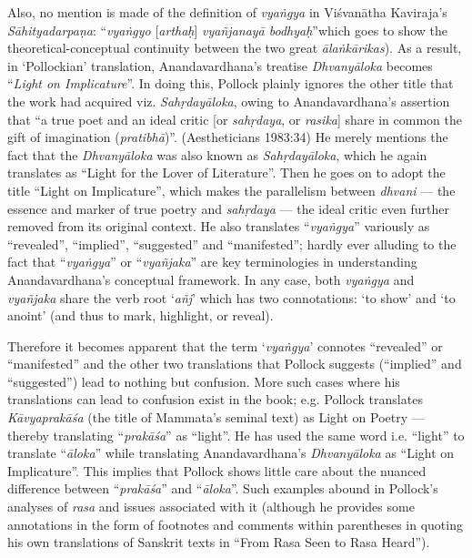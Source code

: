 Also, no mention is made of the definition of \textsl{vyaṅgya} in Viśvanātha Kaviraja’s \textsl{Sāhityadarpaṇa}: “\textsl{vyaṅgyo} [\textsl{arthaḥ}] \textsl{vyañjanayā bodhyaḥ}” which goes to show the theoretical-conceptual continuity between the two great \textsl{ālaṅkārikas}). As a result, in ‘Pollockian’ translation, Anandavardhana’s treatise \textsl{Dhvanyāloka} becomes “\textsl{Light on Implicature}”. In doing this, Pollock plainly ignores the other title that the work had acquired viz. \textsl{Sahṛdayāloka}, owing to Anandavardhana’s assertion that “a true poet and an ideal critic [or \textsl{sahṛdaya}, or \textsl{rasika}] share in common the gift of imagination (\textsl{pratibhā})”. (Aestheticians 1983:34) He merely mentions the fact that the \textsl{Dhvanyāloka} was also known as \textsl{Sahṛdayāloka}, which he again translates as “Light for the Lover of Literature”. Then he goes on to adopt the title “Light on Implicature”, which makes the parallelism between \textsl{dhvani} --- the essence and marker of true poetry and \textsl{sahṛdaya} --- the ideal critic even further removed from its original context. He also translates “\textsl{vyaṅgya}” variously as “revealed”, “implied”, “suggested” and “manifested”; hardly ever alluding to the fact that “\textsl{vyaṅgya}” or “\textsl{vyañjaka}” are key terminologies in understanding Anandavardhana’s conceptual framework. In any case, both \textsl{vyaṅgya} and \textsl{vyañjaka} share the verb root ‘\textsl{añj}’ which has two connotations: ‘to show’ and ‘to anoint’ (and thus to mark, highlight, or reveal). 

Therefore it becomes apparent that the term ‘\textsl{vyaṅgya}’ connotes “revealed” or “manifested” and the other two translations that Pollock suggests (“implied” and “suggested”) lead to nothing but confusion. More such cases where his translations can lead to confusion exist in the book; e.g. Pollock translates \textsl{Kāvyaprakāśa} (the title of Mammata’s seminal text) as Light on Poetry --- thereby translating “\textsl{prakāśa}” as “light”. He has used the same word i.e. “light” to translate “\textsl{āloka}” while translating Anandavardhana’s \textsl{Dhvanyāloka} as “Light on Implicature”. This implies that Pollock shows little care about the nuanced difference between “\textsl{prakāśa}” and “\textsl{āloka}”. Such examples abound in Pollock’s analyses of \textsl{rasa} and issues associated with it (although he provides some annotations in the form of footnotes and comments within parentheses in quoting his own translations of Sanskrit texts in “From Rasa Seen to Rasa Heard”). 

